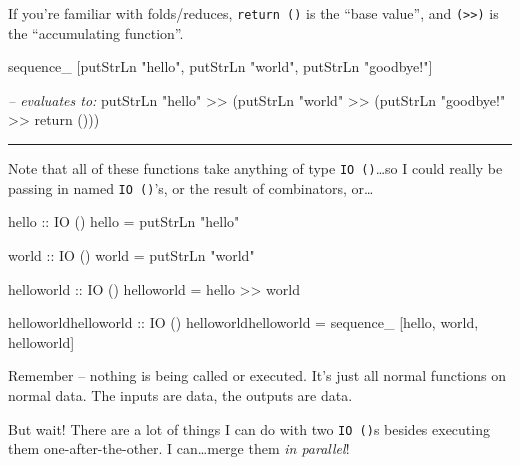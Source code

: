 \documentclass[]{article}
\newenvironment{Shaded}{}{}
\newcommand{\DataTypeTok}[1]{\textcolor[rgb]{0.56,0.13,0.00}{{#1}}}
\newcommand{\StringTok}[1]{\textcolor[rgb]{0.25,0.44,0.63}{{#1}}}
\newcommand{\CommentTok}[1]{\textcolor[rgb]{0.38,0.63,0.69}{\textit{{#1}}}}
\newcommand{\OtherTok}[1]{\textcolor[rgb]{0.00,0.44,0.13}{{#1}}}
\newcommand{\FunctionTok}[1]{\textcolor[rgb]{0.02,0.16,0.49}{{#1}}}
\newcommand{\NormalTok}[1]{{#1}}
\begin{document}
If you're familiar with folds/reduces, \texttt{return\ ()} is the ``base
value'', and \texttt{(\textgreater{}\textgreater{})} is the ``accumulating
function''.

\begin{Shaded}
\begin{Highlighting}[]
\NormalTok{sequence_ [putStrLn }\StringTok{"hello"}\NormalTok{, putStrLn }\StringTok{"world"}\NormalTok{, putStrLn }\StringTok{"goodbye!"}\NormalTok{]}

\CommentTok{-- evaluates to:}
\NormalTok{putStrLn }\StringTok{"hello"} \FunctionTok{>>} \NormalTok{(putStrLn }\StringTok{"world"} \FunctionTok{>>} \NormalTok{(putStrLn }\StringTok{"goodbye!"} \FunctionTok{>>} \NormalTok{return ()))}
\end{Highlighting}
\end{Shaded}

\begin{center}\rule{0.5\linewidth}{\linethickness}\end{center}

Note that all of these functions take anything of type \texttt{IO\ ()}\ldots{}so
I could really be passing in named \texttt{IO\ ()}'s, or the result of
combinators, or\ldots{}

\begin{Shaded}
\begin{Highlighting}[]
\OtherTok{hello ::} \DataTypeTok{IO} \NormalTok{()}
\NormalTok{hello }\FunctionTok{=} \NormalTok{putStrLn }\StringTok{"hello"}

\OtherTok{world ::} \DataTypeTok{IO} \NormalTok{()}
\NormalTok{world }\FunctionTok{=} \NormalTok{putStrLn }\StringTok{"world"}

\OtherTok{helloworld ::} \DataTypeTok{IO} \NormalTok{()}
\NormalTok{helloworld }\FunctionTok{=} \NormalTok{hello }\FunctionTok{>>} \NormalTok{world}

\OtherTok{helloworldhelloworld ::} \DataTypeTok{IO} \NormalTok{()}
\NormalTok{helloworldhelloworld }\FunctionTok{=} \NormalTok{sequence_ [hello, world, helloworld]}
\end{Highlighting}
\end{Shaded}

Remember -- nothing is being called or executed. It's just all normal functions
on normal data. The inputs are data, the outputs are data.

But wait! There are a lot of things I can do with two \texttt{IO\ ()}s besides
executing them one-after-the-other. I can\ldots{}merge them \emph{in parallel}!
\end{document}
